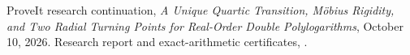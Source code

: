 ProveIt research continuation,
\emph{A Unique Quartic Transition, M\"obius Rigidity, and Two Radial Turning
Points for Real-Order Double Polylogarithms}, October 10, 2026.
Research report and exact-arithmetic certificates,
.
